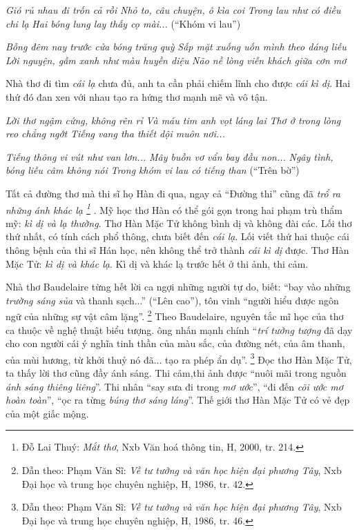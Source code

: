 \documentclass[../main.tex]{subfiles}
\begin{document}
\begin{multicols}{2}
\textit{Gió rủ nhau đi trốn cả rồi} 
\textit{Nhỏ to, câu chuyện, ô kìa coi} 
\textit{Trong lau như có điều chi lạ} 
\textit{Hai bóng lung lay thấy cọ mài...} 
(“Khóm vi lau”) 
 
\textit{Bỗng đêm nay trước cửa bóng trăng quỳ} 
\textit{Sấp mặt xuống uốn mình theo dáng liễu} 
\textit{Lời nguyện, gẫm xanh như màu huyền diệu} 
\textit{Não nề lòng viễn khách giữa cơn mơ} 
 
Nhà thơ đi tìm \textit{cái lạ} chưa đủ, anh ta cần phải chiếm lĩnh cho được \textit{cái kì dị}. Hai thứ đó đan xen với nhau tạo ra hứng thơ mạnh mẽ và vô tận. 
 
\textit{Lời thơ ngậm cứng, không rên rỉ} 
\textit{Và máu tim anh vọt láng lai} 
\textit{Thơ ở trong lòng reo chẳng ngớt} 
\textit{Tiếng vang tha thiết dội muôn nơi...} 
 
\textit{Tiếng thông vi vút như van lơn...} 
\textit{Mây buồn vơ vẩn bay đầu non... } 
\textit{Ngây tình, bóng liễu câm không nói} 
\textit{Trong khóm vi lau có tiếng than } 
(“Trên bờ”) 
 
Tất cả đường thơ mà thi sĩ họ Hàn đi qua, ngay cả “Đường thi” cũng đã \textit{trổ ra những ánh khác lạ \footnote{
Đỗ Lai Thuý: \textit{Mắt thơ}, Nxb Văn hoá thông tin, H, 2000,  tr. 214.} }. Mỹ học thơ Hàn có thể gói gọn trong hai phạm trù thẩm mỹ: \textit{kì dị và lạ thường}. Thơ Hàn Mặc Tử không bình dị và không đài các. Lối thơ thứ nhất, có tính cách phổ thông, chưa biết đến \textit{cái lạ}. Lối viết thứ hai thuộc cái thông bệnh của thi sĩ Hán học, nên không thể trở thành \textit{cái kì dị} được. Thơ Hàn Mặc Tử: \textit{kì dị và khác lạ}. Kì dị và khác lạ trước hết ở thi ảnh, thi cảm.  
 
Nhà thơ Baudelaire từng hết lời ca ngợi những người tự do, biết: “bay vào những \textit{trường sáng sủa} và thanh sạch...” (“Lên cao”), tôn vinh “người hiểu được ngôn ngữ của những sự vật câm lặng”. \footnote{
Dẫn theo: Phạm Văn Sĩ: \textit{Về tư tưởng và văn học hiện đại phương Tây}, Nxb Đại học và trung học chuyên nghiệp, H, 1986,  tr. 42.}  Theo Baudelaire, nguyên tắc mĩ học của thơ ca thuộc về nghệ thuật biểu tượng. ông nhấn mạnh chính “\textit{trí tưởng tượng} đã dạy cho con người cái ý nghĩa tinh thần của màu sắc, của đường nét, của âm thanh, của mùi hương, từ khởi thuỷ nó đã... tạo ra phép ẩn dụ”. \footnote{
Dẫn theo: Phạm Văn Sĩ: \textit{Về tư tưởng và văn học hiện đại phương Tây}, Nxb Đại học và trung học chuyên nghiệp, H, 1986,  tr. 46.}  Đọc thơ Hàn Mặc Tử, ta thấy lời thơ cũng đầy ánh sáng. Thi cảm,thi ảnh được “nuôi mãi trong nguồn \textit{ánh sáng thiêng liêng}”. Thi nhân “say sưa đi trong \textit{mơ ước}”, “đi đến \textit{cõi ước mơ hoàn toàn}”, “ọc ra từng \textit{búng thơ sáng láng}”. Thế giới thơ Hàn Mặc Tử có vẻ đẹp của một giấc mộng. 
 

\end{multicols}
\end{document}
